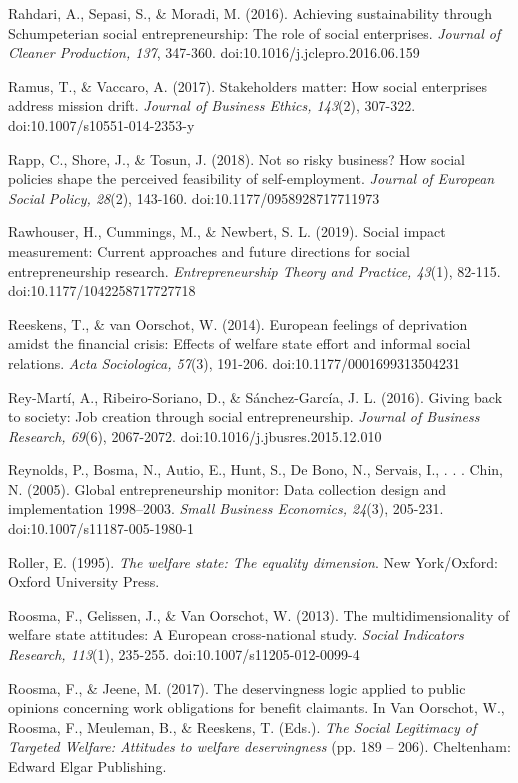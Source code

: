 \documentclass{article}
\begin{document}
Rahdari, A., Sepasi, S., \& Moradi, M. (2016). Achieving sustainability through Schumpeterian social entrepreneurship: The role of social enterprises. \emph{Journal of Cleaner Production, 137}, 347-360. doi:10.1016/j.jclepro.2016.06.159

Ramus, T., \& Vaccaro, A. (2017). Stakeholders matter: How social enterprises address mission drift. \emph{Journal of Business Ethics, 143}(2), 307-322. doi:10.1007/s10551-014-2353-y

Rapp, C., Shore, J., \& Tosun, J. (2018). Not so risky business? How social policies shape the perceived feasibility of self-employment. \emph{Journal of European Social Policy, 28}(2), 143-160. doi:10.1177/0958928717711973

Rawhouser, H., Cummings, M., \& Newbert, S. L. (2019). Social impact measurement: Current approaches and future directions for social entrepreneurship research. \emph{Entrepreneurship Theory and Practice, 43}(1), 82-115. doi:10.1177/1042258717727718

Reeskens, T., \& van Oorschot, W. (2014). European feelings of deprivation amidst the financial crisis: Effects of welfare state effort and informal social relations. \emph{Acta }\emph{Sociologica}\emph{, 57}(3), 191-206. doi:10.1177/0001699313504231

Rey-Martí, A., Ribeiro-Soriano, D., \& Sánchez-García, J. L. (2016). Giving back to society: Job creation through social entrepreneurship. \emph{Journal of Business Research, 69}(6), 2067-2072. doi:10.1016/j.jbusres.2015.12.010

Reynolds, P., Bosma, N., Autio, E., Hunt, S., De Bono, N., Servais, I., . . . Chin, N. (2005). Global entrepreneurship monitor: Data collection design and implementation 1998--2003. \emph{Small Business Economics, 24}(3), 205-231. doi:10.1007/s11187-005-1980-1

Roller, E. (1995). \emph{The welfare state: The equality dimension}. New York/Oxford: Oxford University Press.

Roosma, F., Gelissen, J., \& Van Oorschot, W. (2013). The multidimensionality of welfare state attitudes: A European cross-national study. \emph{Social Indicators Research, 113}(1), 235-255. doi:10.1007/s11205-012-0099-4

Roosma, F., \& Jeene, M. (2017). The deservingness logic applied to public opinions concerning work obligations for benefit claimants. In Van Oorschot, W., Roosma, F., Meuleman, B., \& Reeskens, T. (Eds.). \emph{The Social Legitimacy of Targeted Welfare: Attitudes to welfare deservingness} (pp. 189 -- 206). Cheltenham: Edward Elgar Publishing.
\end{document}
